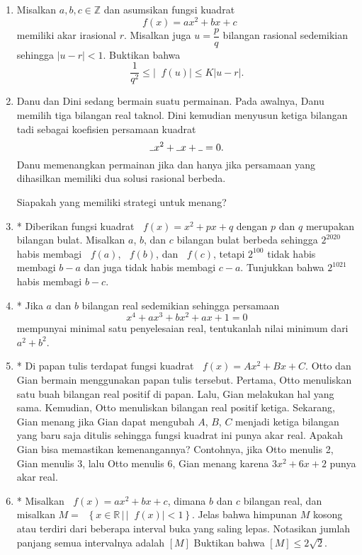 \documentclass[12pt]{article}
\newcommand*\func[2]{\mathop{}\!{#1}{\left({#2}\right)}}
\newcommand*\set[2]{\mathop{}\!\left\lbrace{{#1} \, \left|\, {#2}\right.}\right\rbrace}
\begin{document}
\begin{enumerate}[leftmargin=*]
		\item Misalkan $ a, b, c \in \mathbb{Z} $ dan asumsikan fungsi kuadrat
		\[ \func{f}{x} = ax^{2} + bx + c \]
		memiliki akar irasional $ r $. Misalkan juga $ u = \dfrac{p}{q} $ bilangan rasional sedemikian sehingga $ \left|u - r\right| < 1 $. Buktikan bahwa
		\[ \frac{1}{q^{2}} \leq \left|\func{f}{u}\right| \leq K\left|u - r\right|. \]
		\item Danu dan Dini sedang bermain suatu permainan. Pada awalnya, Danu memilih tiga bilangan real taknol. Dini kemudian menyusun ketiga bilangan tadi sebagai koefisien persamaan kuadrat
		\[ \rule{1ex}{.4pt}x^{2} + \rule{1ex}{.4pt}x + \rule{1ex}{.4pt} = 0. \]
		Danu memenangkan permainan jika dan hanya jika persamaan yang dihasilkan memiliki dua solusi rasional berbeda.
		\par \noindent Siapakah yang memiliki strategi untuk menang?
		\item* Diberikan fungsi kuadrat $ \func{f}{x} = x^{2} + px + q $ dengan $ p $ dan $ q $ merupakan bilangan bulat. Misalkan $ a $, $ b $, dan $ c $ bilangan bulat berbeda sehingga $ 2^{2020} $ habis membagi $ \func{f}{a} $, $ \func{f}{b} $, dan $ \func{f}{c} $, tetapi $ 2^{100} $ tidak habis membagi $ b - a $ dan juga tidak habis membagi $ c - a $. Tunjukkan bahwa $ 2^{1021} $ habis membagi $ b - c $.
		\item* Jika $ a $ dan $ b $ bilangan real sedemikian sehingga persamaan
		\[ x^{4} + ax^{3} + bx^{2} + ax + 1 = 0 \]
		mempunyai minimal satu penyelesaian real, tentukanlah nilai minimum dari $ a^{2} + b^{2} $.
		\item* Di papan tulis terdapat fungsi kuadrat $ \func{f}{x} = Ax^{2} + Bx + C $. Otto dan Gian bermain menggunakan papan tulis tersebut. Pertama, Otto menuliskan satu buah bilangan real positif di papan. Lalu, Gian melakukan hal yang sama. Kemudian, Otto menuliskan bilangan real positif ketiga. Sekarang, Gian menang jika Gian dapat mengubah $ A $, $ B $, $ C $ menjadi ketiga bilangan yang baru saja ditulis sehingga fungsi kuadrat ini punya akar real. Apakah Gian bisa memastikan kemenangannya? Contohnya, jika Otto menulis 2, Gian menulis 3, lalu Otto menulis 6, Gian menang karena $ 3x^{2} + 6x + 2 $ punya akar real.
		\item* Misalkan $ \func{f}{x} = ax^{2} + bx + c $, dimana $ b $ dan $ c $ bilangan real, dan misalkan $ M = \set{x \in \mathbb{R}}{\left|\func{f}{x}\right| < 1} $. Jelas bahwa himpunan $ M $ kosong atau terdiri dari beberapa interval buka yang saling lepas. Notasikan jumlah panjang semua intervalnya adalah $ \left\lbrack{M}\right\rbrack $ Buktikan bahwa $ \left\lbrack{M}\right\rbrack \leq 2\sqrt{2} $.

\end{enumerate}
\end{document}
